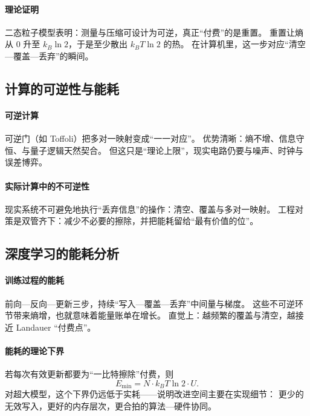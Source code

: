 \paragraph{理论证明}
二态粒子模型表明：测量与压缩可设计为可逆，真正“付费”的是重置。  
重置让熵从 $0$ 升至 $k_B\ln2$，于是至少散出 $k_BT\ln2$ 的热。  
在计算机里，这一步对应“清空—覆盖—丢弃”的瞬间。

\subsection{计算的可逆性与能耗}

\paragraph{可逆计算}
可逆门（如 Toffoli）把多对一映射变成“一一对应”。  
优势清晰：熵不增、信息守恒、与量子逻辑天然契合。  
但这只是“理论上限”，现实电路仍要与噪声、时钟与误差博弈。

\paragraph{实际计算中的不可逆性}
现实系统不可避免地执行“丢弃信息”的操作：清空、覆盖与多对一映射。  
工程对策是双管齐下：减少不必要的擦除，并把能耗留给“最有价值的位”。

\subsection{深度学习的能耗分析}

\paragraph{训练过程的能耗}
前向—反向—更新三步，持续“写入—覆盖—丢弃”中间量与梯度。  
这些不可逆环节带来熵增，也就意味着能量账单在增长。  
直觉上：越频繁的覆盖与清空，越接近 Landauer “付费点”。

\paragraph{能耗的理论下界}
若每次有效更新都要为“一比特擦除”付费，则
$$E_{\min}=N\cdot k_BT\ln2\cdot U.$$
对超大模型，这个下界仍远低于实耗——说明改进空间主要在实现细节：  
更少的无效写入，更好的内存层次，更合拍的算法—硬件协同。


